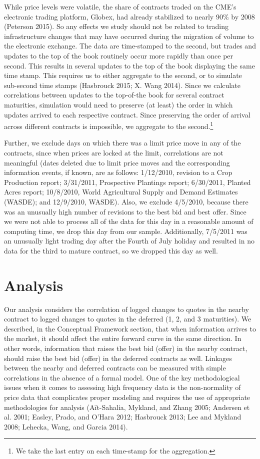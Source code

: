 \documentclass[]{elsarticle} %
\begin{document}
While price levels were volatile, the share of contracts traded on the
CME's electronic trading platform, Globex, had already stabilized to
nearly 90\% by 2008 (Peterson 2015). So any effects we study should not
be related to trading infrastructure changes that may have occurred
during the migration of volume to the electronic exchange. The data are
time-stamped to the second, but trades and updates to the top of the
book routinely occur more rapidly than once per second. This results in
several updates to the top of the book displaying the same time stamp.
This requires us to either aggregate to the second, or to simulate
sub-second time stamps (Hasbrouck 2015; X. Wang 2014). Since we
calculate correlations between updates to the top-of-the book for
several contract maturities, simulation would need to preserve (at
least) the order in which updates arrived to each respective contract.
Since preserving the order of arrival across different contracts is
impossible, we aggregate to the second.\footnote{We take the last entry
  on each time-stamp for the aggregation.}

Further, we exclude days on which there was a limit price move in any of
the contracts, since when prices are locked at the limit, correlations
are not meaningful (dates deleted due to limit price moves and the
corresponding information events, if known, are as follows: 1/12/2010,
revision to a Crop Production report; 3/31/2011, Prospective Plantings
report; 6/30/2011, Planted Acres report; 10/8/2010, World Agricultural
Supply and Demand Estimates (WASDE); and 12/9/2010, WASDE). Also, we
exclude 4/5/2010, because there was an unusually high number of
revisions to the best bid and best offer. Since we were not able to
process all of the data for this day in a reasonable amount of computing
time, we drop this day from our sample. Additionally, 7/5/2011 was an
unusually light trading day after the Fourth of July holiday and
resulted in no data for the third to mature contract, so we dropped this
day as well.

\section{Analysis}\label{analysis}

Our analysis considers the correlation of logged changes to quotes in
the nearby contract to logged changes to quotes in the deferred (1, 2,
and 3 maturities). We described, in the Conceptual Framework section,
that when information arrives to the market, it should affect the entire
forward curve in the same direction. In other words, information that
raises the best bid (offer) in the nearby contract, should raise the
best bid (offer) in the deferred contracts as well. Linkages between the
nearby and deferred contracts can be measured with simple correlations
in the absence of a formal model. One of the key methodological issues
when it comes to assessing high frequency data is the non-normality of
price data that complicates proper modeling and requires the use of
appropriate methodologies for analysis (A{ï}t-Sahalia, Mykland, and
Zhang 2005; Andersen et al. 2001; Easley, Prado, and O'Hara 2012;
Hasbrouck 2013; Lee and Mykland 2008; Lehecka, Wang, and Garcia 2014).
\end{document}
